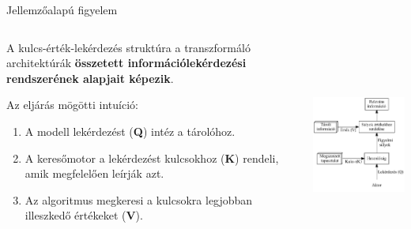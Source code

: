 \documentclass[english, aspectratio=169]{beamer}
\begin{document}
\begin{frame}{Jellemzőalapú figyelem}
\begin{columns}
\begin{column}{.5\textwidth}
A kulcs-érték-lekérdezés struktúra a transzformáló architektúrák \textbf{összetett információlekérdezési rendszerének alapjait képezik}.\par\smallskip
Az eljárás mögötti intuíció:
\begin{enumerate}
	\item A modell lekérdezést (\textbf{Q}) intéz a tárolóhoz.
	\item A keresőmotor a lekérdezést kulcsokhoz (\textbf{K}) rendeli, amik megfelelően leírják azt.
	\item Az algoritmus megkeresi a kulcsokra legjobban illeszkedő értékeket (\textbf{V}).
\end{enumerate}
\end{column}
\begin{column}{.5\textwidth}
\begin{center}
\includegraphics[width=7cm, height=7cm, keepaspectratio]{graphs/transformer_12.png}
\end{center}
\end{column}
\end{columns}
\end{frame}
\end{document}
